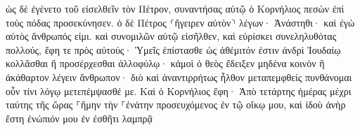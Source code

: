 \documentclass{openreader}
\begin{document}
ὡς δὲ ἐγένετο τοῦ εἰσελθεῖν τὸν Πέτρον, συναντήσας αὐτῷ ὁ Κορνήλιος πεσὼν ἐπὶ τοὺς πόδας προσεκύνησεν. 
ὁ δὲ Πέτρος ⸂ἤγειρεν αὐτὸν⸃ λέγων· Ἀνάστηθι· καὶ ἐγὼ αὐτὸς ἄνθρωπός εἰμι. 
καὶ συνομιλῶν αὐτῷ εἰσῆλθεν, καὶ εὑρίσκει συνεληλυθότας πολλούς, 
ἔφη τε πρὸς αὐτούς· Ὑμεῖς ἐπίστασθε ὡς ἀθέμιτόν ἐστιν ἀνδρὶ Ἰουδαίῳ κολλᾶσθαι ἢ προσέρχεσθαι ἀλλοφύλῳ· κἀμοὶ ὁ θεὸς ἔδειξεν μηδένα κοινὸν ἢ ἀκάθαρτον λέγειν ἄνθρωπον· 
διὸ καὶ ἀναντιρρήτως ἦλθον μεταπεμφθείς πυνθάνομαι οὖν τίνι λόγῳ μετεπέμψασθέ με. 
Καὶ ὁ Κορνήλιος ἔφη· Ἀπὸ τετάρτης ἡμέρας μέχρι ταύτης τῆς ὥρας ⸀ἤμην τὴν ⸀ἐνάτην προσευχόμενος ἐν τῷ οἴκῳ μου, καὶ ἰδοὺ ἀνὴρ ἔστη ἐνώπιόν μου ἐν ἐσθῆτι λαμπρᾷ 
\end{document}

